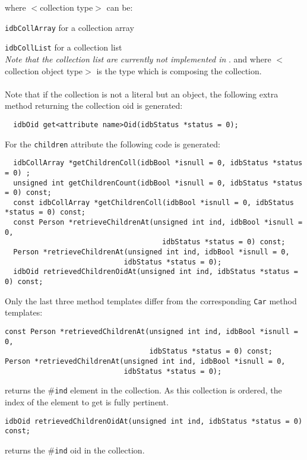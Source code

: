 \normalsize
where $<$collection type$>$ can be:
\be
\item \texttt{idbCollArray} for a collection array
\item \texttt{idbCollList} for a collection list\\
\emph{Note that the collection list are currently not implemented in
\eyedb}.
\ee
and where $<$collection object type$>$ is the type which is composing
the collection.
\\
\\
Note that if the collection is not a literal but an object, the following
extra method returning the collection oid is generated:
\verbsize
\begin{verbatim}
  idbOid get<attribute name>Oid(idbStatus *status = 0);
\end{verbatim}
\normalsize
For the \texttt{children} attribute the following code is generated:
\verbsize
\begin{verbatim}
  idbCollArray *getChildrenColl(idbBool *isnull = 0, idbStatus *status = 0) ;
  unsigned int getChildrenCount(idbBool *isnull = 0, idbStatus *status = 0) const;
  const idbCollArray *getChildrenColl(idbBool *isnull = 0, idbStatus *status = 0) const;
  const Person *retrieveChildrenAt(unsigned int ind, idbBool *isnull = 0,
                                     idbStatus *status = 0) const;
  Person *retrieveChildrenAt(unsigned int ind, idbBool *isnull = 0,
                            idbStatus *status = 0);
  idbOid retrievedChildrenOidAt(unsigned int ind, idbStatus *status = 0) const;
\end{verbatim}
\normalsize
Only the last three method templates differ from the corresponding
\texttt{Car} method templates:
\be
\item
\verbsize
\begin{verbatim}
const Person *retrievedChildrenAt(unsigned int ind, idbBool *isnull = 0,
                                  idbStatus *status = 0) const;
Person *retrievedChildrenAt(unsigned int ind, idbBool *isnull = 0,
                            idbStatus *status = 0);
\end{verbatim}
\normalsize
returns the \#\texttt{ind} element in the collection.
As this collection is ordered, the index of the element to get is fully
pertinent.
\item
\verbsize
\begin{verbatim}
idbOid retrievedChildrenOidAt(unsigned int ind, idbStatus *status = 0) const;
\end{verbatim}
\normalsize
returns the \#\texttt{ind} oid in the collection.
